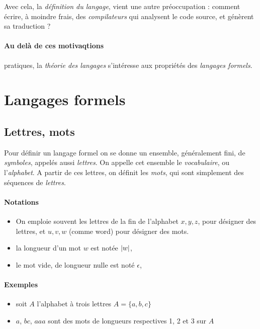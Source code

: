 Avec cela, la \emph{définition du langage}, vient une autre
préoccupation : comment écrire, à moindre frais, des
\emph{compilateurs} qui analysent le code source, et génèrent sa
traduction ?



\paragraph{Au delà de ces motivaqtions} pratiques, la \emph{ théorie des langages} s'intéresse aux propriétés
des \emph{langages formels}.


\section{Langages formels}

\subsection{Lettres, mots}

 Pour définir un langage formel on se donne un ensemble, généralement
fini, de \emph{symboles}, appelés aussi \emph{lettres}.  On appelle cet ensemble le
\emph{vocabulaire}, ou l'\emph{alphabet}.
A partir de ces lettres, on définit les \emph{mots}, qui sont simplement des séquences de \emph{lettres}.


\paragraph{Notations}
\begin{itemize}
\item On emploie souvent les lettres de la fin de l'alphabet $x, y, z$, pour désigner des lettres,
et $u,v, w$ (comme word) pour désigner des mots.
\item la longueur d'un mot $w$ est notée $|w|$,
\item le mot vide, de longueur nulle est noté $\epsilon$,
\end{itemize}
\paragraph{Exemples} 

\begin{itemize}
\item soit $A$ l'alphabet à trois lettres $A = \{ a, b, c \}$
\item $a$, $bc$, $aaa$ sont des mots de longueurs respectives 1, 2 et 3 sur $A$
\end{itemize}


